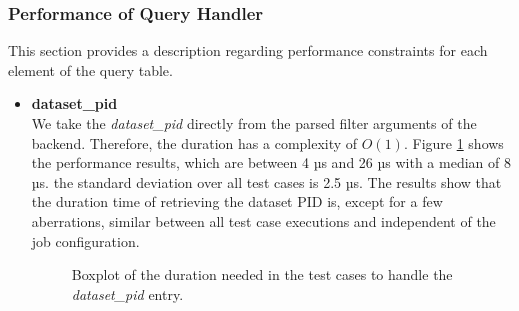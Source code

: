 \documentclass[draft,final]{vutinfth} %
\begin{document}
\subsubsection{Performance of Query Handler}\label{Evaluation:impact_perf_query}
This section provides a description regarding performance constraints for each element of the query table.

\begin{itemize}
	\item \textbf{dataset\_pid} \\
	We take the \textit{dataset\_pid} directly from the parsed filter arguments of the backend. Therefore, the duration has a complexity of $O(1)$. Figure \ref{fig:evaluation_perf_datapid} shows the performance results, which are between 4 µs and 26 µs with a median of 8 µs. the standard deviation over all test cases is 2.5 µs. The results show that the duration time of retrieving the dataset PID is, except for a few aberrations, similar between all test case executions and independent of the job configuration.
	\begin{figure}[!h]
		\centering
		\caption{Boxplot of the duration needed in the test cases to handle the \textit{dataset\_pid} entry. }
		\label{fig:evaluation_perf_datapid}
	\end{figure}


\end{itemize}
\end{document}
